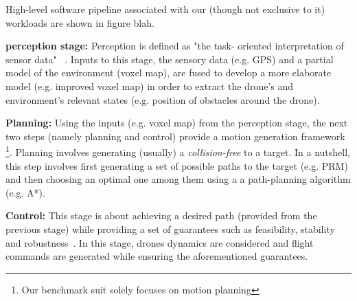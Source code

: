 High-level software pipeline associated with our (though not exclusive to it) workloads are shown in figure blah. 

\textbf{perception stage:}
Perception is defined as "the task- oriented interpretation of sensor data" ~\cite{Handbook_robotic}. Inputs to this stage, the sensory data (e.g. GPS) and a partial model of the environment (voxel map), are fused to develop a more elaborate model (e.g. improved voxel map) in order to extract the drone's and environment's relevant states (e.g. position of obstacles around the drone). 

\textbf{Planning:}
Using the inputs (e.g. voxel map) from the perception stage, the next two steps (namely planning and control) provide a motion generation framework \footnote{Our benchmark suit solely focuses on motion planning}. Planning involves generating (usually) a \textit{collision-free} to a target. In a nutshell, this step involves first generating a set of possible paths to the target (e.g. PRM) and then choosing an optimal one among them using a a path-planning algorithm (e.g. A*). 


\textbf{Control:}
This stage is about achieving a desired path (provided from the previous stage) while providing a set of guarantees such as feasibility, stability and robustness~\cite{tech_problem}. In this stage, drones dynamics are considered and flight commands are generated while ensuring the aforementioned guarantees.  

